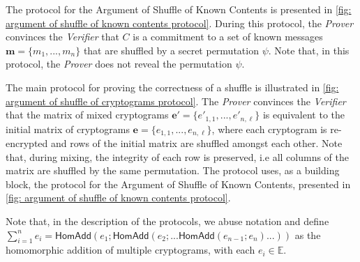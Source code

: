 The protocol for the Argument of Shuffle of Known Contents is presented in \cref{fig: argument of shuffle of known contents protocol}. During this protocol, the \textit{Prover} convinces the \textit{Verifier} that $C$ is a commitment to a set of known messages $\boldsymbol{m} = \{ m_1, ..., m_n \}$ that are shuffled by a secret permutation $\psi$. Note that, in this protocol, the \textit{Prover} does not reveal the permutation $\psi$.

The main protocol for proving the correctness of a shuffle is illustrated in \cref{fig: argument of shuffle of cryptograms protocol}. The \textit{Prover} convinces the \textit{Verifier} that the matrix of mixed cryptograms $\boldsymbol{e'} = \{ e'_{1, 1}, ..., e'_{n, \ell} \}$ is equivalent to the initial matrix of cryptograms $\boldsymbol{e} = \{ e_{1, 1}, ..., e_{n, \ell} \}$, where each cryptogram is re-encrypted and rows of the initial matrix are shuffled amongst each other. Note that, during mixing, the integrity of each row is preserved, i.e all columns of the matrix are shuffled by the same permutation. The protocol uses, as a building block, the protocol for the Argument of Shuffle of Known Contents, presented in \cref{fig: argument of shuffle of known contents protocol}.

Note that, in the description of the protocols, we abuse notation and define $\sum_{i=1}^n e_i = \mathsf{HomAdd}(e_1; \mathsf{HomAdd}(e_2; ... \mathsf{HomAdd}(e_{n-1}; e_n) ... ))$ as the homomorphic addition of multiple cryptograms, with each $e_i \in \mathbb{E}$.

